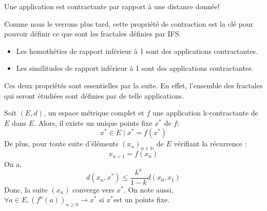 \documentclass[a4paper, 12pt]{report}
\begin{document}
			\begin{remark*}
				Une application est contractante  par rapport à une distance donnée!
			\end{remark*}

			Comme nous le verrons plus tard, cette propriété de contraction est la clé pour pouvoir définir ce que sont les fractales définies par IFS. 
			\begin{prop}
				\begin{itemize}
					\item Les homothéties de rapport inférieur à 1 sont des applications contractantes.
					\item Les similitudes de rapport inférieur à 1 sont des applications contractantes.
				\end{itemize}
			\end{prop}
			Ces deux propriétés sont essentielles par la suite. En effet, l'ensemble des fractales qui seront étudiées sont définies par de telle applications.
			
			\begin{theorem}
				\label{ThmPtFixe}
				Soit $(E,d)$, un espace métrique complet et $f$ une application k-contractante de $E$ dans $E$. Alors, il existe un unique points fixe $x^*$ de $f$:
				\begin{equation*}
					x^*\in E\mid x^*=f(x^*)
				\end{equation*}
				De plus, pour toute suite d'éléments $(x_n)_{n\in\mathds{N}}$ de $E$ vérifiant la récurrence :
				\begin{equation*}
					x_{n+1}=f(x_n)
				\end{equation*}
				On a,
				\begin{equation}
					d(x_n,x^*)\leq \frac{k^n}{1-k} d(x_0,x_1)
				\end{equation}
				Donc, la suite $(x_n)$ converge vers $x^*$.
				On note aussi, $\forall a\in E,(f^n(a))_{n\geq 0}\longrightarrow x^*$ si $x^*$est un points fixe.
			\end{theorem}
\end{document}

